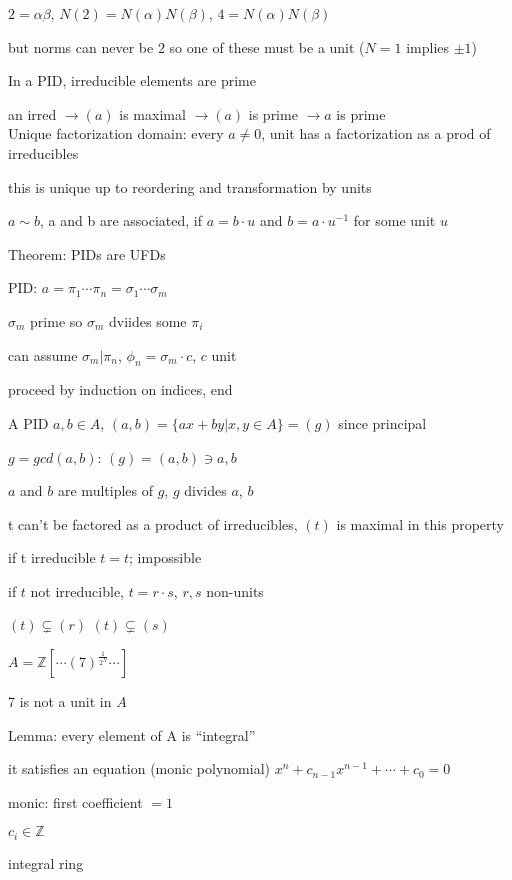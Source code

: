 \documentclass[12pt]{article}
\begin{document}
$2 = \alpha\beta$, $N(2) = N(\alpha)N(\beta)$, $4 = N(\alpha)N(\beta)$

but norms can never be $2$ so one of these must be a unit ($N = 1$ implies $\pm 1$)

\noindent
In a PID, irreducible elements are prime

an irred $\to (a)$ is maximal $\to (a)$ is prime $\to a$ is prime\\

\noindent
Unique factorization domain: every $a \neq 0$, unit has a factorization as a prod of irreducibles

this is unique up to reordering and transformation by units

$a \sim b$, a and b are associated, if $a = b \cdot u$ and $b = a \cdot u^{-1}$ for some unit $u$

\noindent
Theorem: PIDs are UFDs

PID: $a = \pi_1 \cdots \pi_n = \sigma_1 \cdots \sigma_m$

$\sigma_m$ prime so $\sigma_m$ dviides some $\pi_i$

can assume $\sigma_m | \pi_n$, $\phi_n = \sigma_m \cdot c$, $c$ unit

proceed by induction on indices, end

\noindent
A PID $a, b \in A$, $(a, b) = \{ax + by | x, y \in A\} = (g)$ since principal

$g = gcd(a, b)$: $(g) = (a, b) \ni a, b$

$a$ and $b$ are multiples of $g$, $g$ divides $a$, $b$

\noindent
t can't be factored as a product of irreducibles, $(t)$ is maximal in this property

\noindent
if t irreducible $t = t$; impossible

if $t$ not irreducible, $t = r \cdot s$, $r, s$ non-units

$(t) \subsetneq (r)$ $(t) \subsetneq (s)$

\noindent
$A = \mathds{Z}[\cdots (7)^{\frac{1}{2^N}} \cdots]$

7 is not a unit in $A$

\noindent
Lemma: every element of A is ``integral''

it satisfies an equation (monic polynomial) $x^n + c_{n-1}x^{n-1} + \cdots + c_0 = 0$

monic: first coefficient $= 1$

$c_i \in \mathds{Z}$

integral ring
\end{document}
